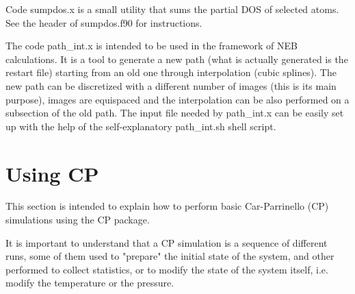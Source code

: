 \documentclass[12pt,a4paper]{article}
\begin{document}
Code sumpdos.x is a small utility that sums the partial DOS of
selected atoms. See the header of  sumpdos.f90 for instructions.

The code path\_int.x is intended to be used in the framework of NEB
calculations. It is a tool to generate a new path (what is actually
generated is the restart file) starting from an old one through
interpolation (cubic splines). The new path can be discretized with a
different number of images (this is its main purpose), images are
equispaced and the interpolation can be also 
performed on a subsection of the old path. The input file needed by
path\_int.x can be easily set up  with the help of the self-explanatory
path\_int.sh shell script. 

\section{Using CP}

This section is intended to explain how to perform basic Car-Parrinello (CP)
simulations using the CP package.
    
It is important to understand that a CP simulation is a sequence of different 
runs, some of them used to "prepare" the initial state of the system, and 
other performed to collect statistics, or to modify the state of the system
itself, i.e. modify the temperature or the pressure.
    
\end{document}
